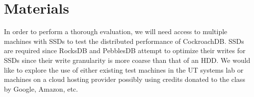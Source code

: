 \documentclass[10pt,twocolumn,letterpaper]{article}
\begin{document}
\section{Materials}
In order to perform a thorough evaluation, we will need access to multiple
machines with SSDs to test the distributed performance of CockroachDB. SSDs are
required since RocksDB and PebblesDB attempt to optimize their writes for SSDs
since their write granularity is more coarse than that of an HDD. We would like
to explore the use of either existing test machines in the UT systems lab or
machines on a cloud hosting provider possibly using credits donated to the
class by Google, Amazon, etc.

\end{document}
